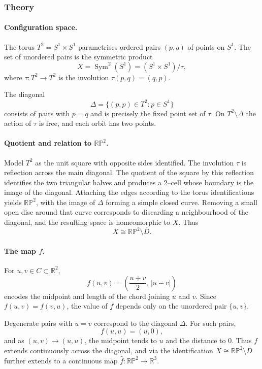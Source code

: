\documentclass[12pt,a4paper]{article}
\theoremstyle{plain}
\theoremstyle{definition}      %
\begin{document}
\subsubsection*{Theory}

\paragraph{Configuration space.}
The torus $T^{2}=S^{1}\times S^{1}$ parametrises ordered pairs $(p,q)$ of
points on $S^{1}$.  The set of unordered pairs is the symmetric product
\[
X = \operatorname{Sym}^{2}(S^{1})
= (S^{1}\times S^{1})/\tau,
\]
where $\tau:T^{2}\to T^{2}$ is the involution $\tau(p,q)=(q,p)$.

The diagonal
\[
\Delta=\{(p,p)\in T^{2}:p\in S^{1}\}
\]
consists of pairs with $p=q$ and is precisely the fixed point set of $\tau$.
On $T^{2}\setminus\Delta$ the action of $\tau$ is free, and each orbit has
two points.

\paragraph{Quotient and relation to $\mathbb{RP}^{2}$.}
Model $T^{2}$ as the unit square with opposite sides identified.
The involution $\tau$ is reflection across the main diagonal.  The quotient
of the square by this reflection identifies the two triangular halves and
produces a 2--cell whose boundary is the image of the diagonal.  Attaching the
edges according to the torus identifications yields $\mathbb{RP}^{2}$, with the
image of $\Delta$ forming a simple closed curve.  Removing a small open disc
around that curve corresponds to discarding a neighbourhood of the diagonal,
and the resulting space is homeomorphic to $X$.  Thus
\[
X \cong \mathbb{RP}^{2}\setminus\overline{D}.
\]

\paragraph{The map $f$.}
For $u,v\in C\subset\mathbb{R}^{2}$,
\[
f(u,v)=\left(\frac{u+v}{2},\,|u-v|\right)
\]
encodes the midpoint and length of the chord joining $u$ and $v$.
Since $f(u,v)=f(v,u)$, the value of $f$ depends only on the unordered pair
$\{u,v\}$.

Degenerate pairs with $u=v$ correspond to the diagonal $\Delta$.
For such pairs,
\[
f(u,u)=(u,0),
\]
and as $(u,v)\to(u,u)$, the midpoint tends to $u$ and the distance to $0$.
Thus $f$ extends continuously across the diagonal, and via the identification
$X\cong\mathbb{RP}^{2}\setminus\overline{D}$ further extends to a continuous
map $\hat f:\mathbb{RP}^{2}\to\mathbb{R}^{3}$.
\end{document}
